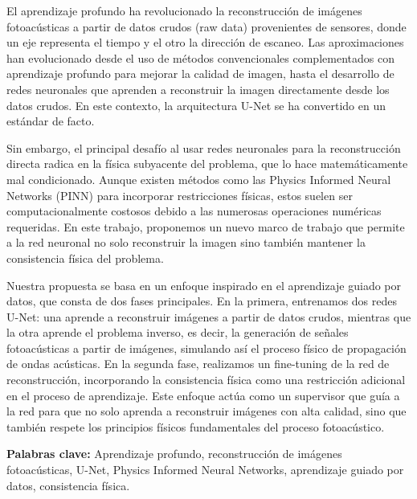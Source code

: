 El aprendizaje profundo ha revolucionado la reconstrucción de imágenes fotoacústicas a partir de datos crudos (raw data) provenientes de sensores, donde un eje representa el tiempo y el otro la dirección de escaneo. Las aproximaciones han evolucionado desde el uso de métodos convencionales complementados con aprendizaje profundo para mejorar la calidad de imagen, hasta el desarrollo de redes neuronales que aprenden a reconstruir la imagen directamente desde los datos crudos. En este contexto, la arquitectura U-Net se ha convertido en un estándar de facto.

Sin embargo, el principal desafío al usar redes neuronales para la reconstrucción directa radica en la física subyacente del problema, que lo hace matemáticamente mal condicionado. Aunque existen métodos como las Physics Informed Neural Networks (PINN) para incorporar restricciones físicas, estos suelen ser computacionalmente costosos debido a las numerosas operaciones numéricas requeridas. En este trabajo, proponemos un nuevo marco de trabajo que permite a la red neuronal no solo reconstruir la imagen sino también mantener la consistencia física del problema.

Nuestra propuesta se basa en un enfoque inspirado en el aprendizaje guiado por datos, que consta de dos fases principales. En la primera, entrenamos dos redes U-Net: una aprende a reconstruir imágenes a partir de datos crudos, mientras que la otra aprende el problema inverso, es decir, la generación de señales fotoacústicas a partir de imágenes, simulando así el proceso físico de propagación de ondas acústicas. En la segunda fase, realizamos un fine-tuning de la red de reconstrucción, incorporando la consistencia física como una restricción adicional en el proceso de aprendizaje. Este enfoque actúa como un supervisor que guía a la red para que no solo aprenda a reconstruir imágenes con alta calidad, sino que también respete los principios físicos fundamentales del proceso fotoacústico.

\textbf{Palabras clave:} Aprendizaje profundo, reconstrucción de imágenes fotoacústicas, U-Net, Physics Informed Neural Networks, aprendizaje guiado por datos, consistencia física.

